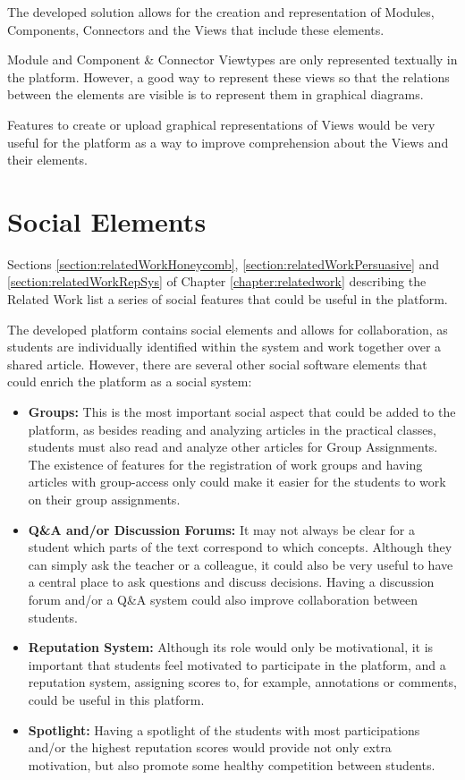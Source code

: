 The developed solution allows for the creation and representation of Modules, Components, Connectors and the Views that include these elements. 

Module and Component \& Connector Viewtypes are only represented textually in the platform. However, a good way to represent these views so that the relations between the elements are visible is to represent them in graphical diagrams. 

Features to create or upload graphical representations of Views would be very useful for the platform as a way to improve comprehension about the Views and their elements.

\section{Social Elements}

Sections \ref{section:relatedWorkHoneycomb}, \ref{section:relatedWorkPersuasive} and  \ref{section:relatedWorkRepSys} of Chapter \ref{chapter:relatedwork} describing the Related Work list a series of social features that could be useful in the platform.

The developed platform contains social elements and allows for collaboration, as students are individually identified within the system and work together over a shared article. However, there are several other social software elements that could enrich the platform as a social system:

\begin{itemize}
\item \textbf{Groups:} This is the most important social aspect that could be added to the platform, as besides reading and analyzing articles in the practical classes, students must also read and analyze other articles for Group Assignments. The existence of features for the registration of work groups and having articles with group-access only could make it easier for the students to work on their group assignments.

\item \textbf{Q\&A and/or Discussion Forums:} It may not always be clear for a student which parts of the text correspond to which concepts. Although they can simply ask the teacher or a colleague, it could also be very useful to have a central place to ask questions and discuss decisions. Having a discussion forum and/or a Q\&A system could also improve collaboration between students.

\item \textbf{Reputation System: } Although its role would only be motivational, it is important that students feel motivated to participate in the platform, and a reputation system, assigning scores to, for example, annotations or comments, could be useful in this platform.

\item \textbf{Spotlight: } Having a spotlight of the students with most participations and/or the highest reputation scores would provide not only extra motivation, but also promote some healthy competition between students.
\end{itemize}
